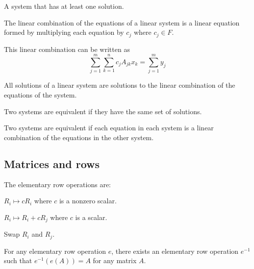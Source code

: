 \begin{definition} A system that has at least one solution.
\end{definition}

\begin{definition}
  The linear combination of the equations of a linear system is a linear equation formed by multiplying each equation by $c_j$ where $c_j \in F$.

  This linear combination can be written as
  \[
    \sum_{j = 1}^m \sum_{k = 1}^n c_j A_{jk} x_k = \sum_{j = 1}^m y_j
  \]
\end{definition}

\begin{theorem}
  All solutions of a linear system are solutions to the linear combination of the equations of the system.
\end{theorem}

\begin{definition} Two systems are equivalent if they have the same set of solutions.
\end{definition}

\begin{theorem} Two systems are equivalent if each equation in each system is a linear combination of the equations in the other system.
\end{theorem}

\subsection{Matrices and rows}

\begin{definition}
  The elementary row operations are:

  \begin{definition}[Scaling]
    $R_i \mapsto cR_i$ where $c$ is a nonzero scalar.
  \end{definition}

  \begin{definition}[Replacement]
    $R_i \mapsto R_i + cR_j$ where $c$ is a scalar.
  \end{definition}

  \begin{definition}[Interchange]
    Swap $R_i$ and $R_j$.
  \end{definition}
\end{definition}

\begin{theorem} For any elementary row operation $e$, there exists an elementary row operation $e^{-1}$ such that $e^{-1}(e(A)) = A$ for any matrix $A$.
\end{theorem}

